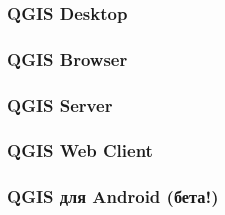 
\begin{frame}
    \frametitle{QGIS Desktop}

\end{frame}


\begin{frame}
    \frametitle{QGIS Browser}

\end{frame}

\begin{frame}
    \frametitle{QGIS Server}

\end{frame}

\begin{frame}
    \frametitle{QGIS Web Client}

\end{frame}


\begin{frame}
    \frametitle{QGIS для Android (бета!)}

\end{frame}
